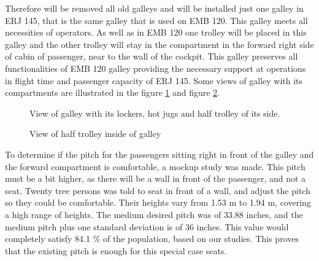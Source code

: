 	Therefore will be removed all old galleys and will be installed just one galley in ERJ 145, that is the same galley that is used on EMB 120. This galley meets all necessities of operators. As well as in EMB 120 one trolley will be placed in this galley and the other trolley will stay in the compartment in the forward right side of cabin of passenger, near to the wall of the cockpit. This galley preserves all functionalities of EMB 120 galley providing the necessary support at operations in flight time and passenger capacity of ERJ 145. Some views of galley with its compartments are illustrated in the figure \ref{fig:InteriorArrangements} and figure \ref{fig:viewhalftrolley}.

\begin{figure}[H]
\caption{View of galley with its lockers, hot jugs and half trolley of its side.}
\label{fig:InteriorArrangements}
\end{figure}



\begin{figure}[H]
\caption{View of half trolley inside of galley}
\label{fig:viewhalftrolley}
\end{figure}

	To determine if the pitch for the passengers sitting right in front of the galley and the forward compartment is comfortable, a mockup study was made. This pitch must be a bit higher, as there will be a wall in front of the passenger, and not a seat. Twenty tree persons was told to seat in front of a wall, and adjust the pitch so they could be comfortable. Their heights vary from 1.53 m to 1.94 m, covering a high range of heights. The medium desired pitch was of 33.88 inches, and the medium pitch plus one standard deviation is of 36 inches. This value would completely satisfy 84.1 \% of the population, based on our studies. This proves that the existing pitch is enough for this special case seats.


